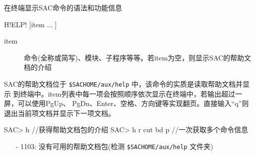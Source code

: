 \label{cmd:help}

在终端显示SAC命令的语法和功能信息

\begin{SACSTX}
H!ELP! [item ... ]
\end{SACSTX}

\begin{description}
\item [item] 命令(全称或简写)、模块、子程序等等。若item为空，则显示SAC的帮助文档的介绍
\end{description}

SAC的帮助文档位于 \verb|$SACHOME/aux/help| 中，该命令的实质是读取帮助文档并显示
到终端中。item列表中每一项会按照顺序依次显示在终端中，若输出超过一屏，可以使用PgUp、
PgDn、Enter、空格、方向键等实现翻页。直接输入``q''则退出当前项文档并显示下一项文档。

\begin{SACCode}
SAC> h                  //获得帮助文档包的介绍
SAC> h r cut bd p       //一次获取多个命令信息
\end{SACCode}

\begin{itemize}
\item[-]1103: 没有可用的帮助文档包(检测 \verb|$SACHOME/aux/help| 文件夹)
\end{itemize}
